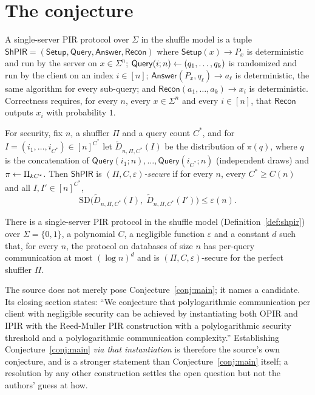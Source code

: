 \documentclass{aicr-conjecture}
\newcommand{\Sig}{\Sigma}
\newcommand{\eps}{\varepsilon}
\newcommand{\SD}{\mathrm{SD}}
\newcommand{\ShPIR}{\mathsf{ShPIR}}
\newcommand{\Query}{\mathsf{Query}}
\newcommand{\Answer}{\mathsf{Answer}}
\newcommand{\Setup}{\mathsf{Setup}}
\newcommand{\Recon}{\mathsf{Recon}}
\begin{document}
\section{The conjecture}\label{sec:conjectures}

\begin{definition}\label{def:shpir}
A single-server PIR protocol over $\Sig$ in the shuffle model is a tuple
$\ShPIR = (\Setup, \Query, \Answer, \Recon)$ where $\Setup(x) \to P_{x}$
is deterministic and run by the server on $x \in \Sig^{n}$; $\Query(i;n)
\sample (q_{1}, \dots, q_{k})$ is randomized and run by the client on an
index $i \in [n]$; $\Answer(P_{x}, q_{\ell}) \to a_{\ell}$ is
deterministic, the same algorithm for every sub-query; and
$\Recon(a_{1}, \dots, a_{k}) \to x_{i}$ is deterministic. Correctness
requires, for every $n$, every $x \in \Sig^{n}$ and every $i \in [n]$,
that $\Recon$ outputs $x_{i}$ with probability $1$.

For security, fix $n$, a shuffler $\Pi$ and a query count $C^{*}$, and
for $I = (i_{1}, \dots, i_{C^{*}}) \in [n]^{C^{*}}$ let
$\widetilde{D}_{n,\Pi,C^{*}}(I)$ be the distribution of $\pi(q)$, where
$q$ is the concatenation of $\Query(i_{1};n), \dots,
\Query(i_{C^{*}};n)$ (independent draws) and $\pi \leftarrow \Pi_{k
C^{*}}$. Then $\ShPIR$ is \emph{$(\Pi, C, \eps)$-secure} if for every
$n$, every $C^{*} \ge C(n)$ and all $I, I' \in [n]^{C^{*}}$,
\[
  \SD\bigl( \widetilde{D}_{n,\Pi,C^{*}}(I),\;
  \widetilde{D}_{n,\Pi,C^{*}}(I') \bigr) \le \eps(n).
\]
\end{definition}

\begin{conjecture}\label{conj:main}
There is a single-server PIR protocol in the shuffle model
(Definition~\ref{def:shpir}) over $\Sig = \{0,1\}$, a polynomial $C$, a
negligible function $\eps$ and a constant $d$ such that, for every $n$,
the protocol on databases of size $n$ has per-query communication at
most $(\log n)^{d}$ and is $(\Pi, C, \eps)$-secure for the perfect
shuffler $\Pi$.
\end{conjecture}

\begin{remark}
The source does not merely pose Conjecture~\ref{conj:main}; it names a
candidate. Its closing section states: ``We conjecture that
polylogarithmic communication per client with negligible security can be
achieved by instantiating both OPIR and IPIR with the Reed-Muller PIR
construction with a polylogarithmic security threshold and a
polylogarithmic communication complexity.'' Establishing
Conjecture~\ref{conj:main} \emph{via that instantiation} is therefore
the source's own conjecture, and is a stronger statement than
Conjecture~\ref{conj:main} itself; a resolution by any other
construction settles the open question but not the authors' guess at how.
\end{remark}
\end{document}
